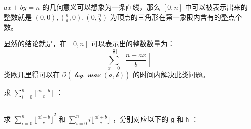 $ax+by=n$ 的几何意义可以想象为一条直线，那么 $[0,n]$ 中可以被表示出来的整数就是 $(0,0),\left(\frac{n}{a},0\right),\left(0,\frac{n}{b}\right)$ 为顶点的三角形在第一象限内含有的整点个数。

显然的结论就是，在 $[0,n]$ 可以表示出的整数数量为：
$$
\sum_{x=0}^{\lfloor\frac{n}{a}\rfloor}\left\lfloor\dfrac{n-ax}{b}\right\rfloor
$$
类欧几里得可以在 $\mathcal{O(\log{\max(a,b)})}$ 的时间内解决此类问题。

求 $\sum_{i=0}^{n}\lfloor \frac{ai+b}{c} \rfloor$ ：
\inputminted{cpp}{src/else/euclid1.cpp}
求 $\sum_{i=0}^{n}{\lfloor \frac{ai+b}{c} \rfloor}^2$ 和 $\sum\limits_{i=0}^{n}i\lfloor \frac{ai+b}{c} \rfloor$ ，分别对应以下的 \verb|g| 和 \verb|h| ：
\inputminted{cpp}{src/else/euclid2.cpp}